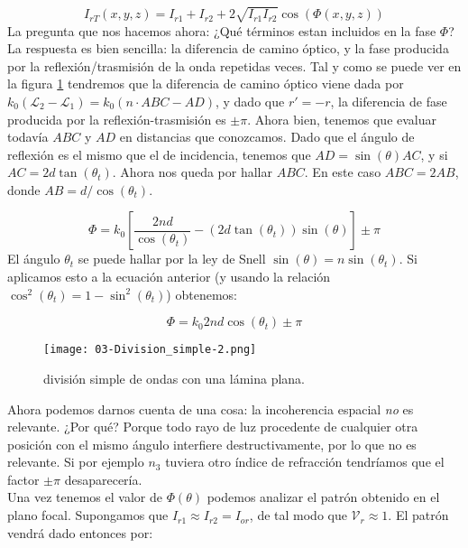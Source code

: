 \documentclass[12pt,a4paper]{book}
\numberwithin{equation}{section}
\numberwithin{figure}{section}
\newcommand{\ccorchetes}[1]{\left[ #1  \right]}
\newcommand{\1}{_{(1)}}
\newcommand{\2}{_{(2)}}
\theoremstyle{definition}
\begin{document}
\begin{equation}
I_{rT} (x,y,z) = I_{r1}+I_{r2} + 2 \sqrt{I_{r1} I_{r2}} \cos (\Phi(x,y,z))
\end{equation}
La pregunta que nos hacemos ahora: ¿Qué términos estan incluidos en la fase $\Phi$? La respuesta es bien sencilla: la diferencia de camino óptico, y la fase producida por la reflexión/trasmisión de la onda repetidas veces. Tal y como se puede ver en la figura \ref{Fig:03.1-02} tendremos que la diferencia de camino óptico viene dada por $k_0(\mathcal{L}_2 - \mathcal{L_1}) =k_0( n\cdot ABC-AD)$, y dado que $r'=-r$, la diferencia de fase producida por la reflexión-trasmisión es $\pm \pi$. Ahora bien, tenemos que evaluar todavía $ABC$ y $AD$ en distancias que conozcamos. Dado que el ángulo de reflexión es el mismo que el de incidencia, tenemos que $ {AD} = \sin(\theta) {AC}$, y si $AC=2  d \tan (\theta_t)$. Ahora nos queda por hallar $ABC$. En este caso $ABC=2AB$, donde $AB=d/\cos(\theta_t)$.

\begin{equation}
\Phi = k_0 \ccorchetes{\frac{2nd}{\cos (\theta_t)} - (2d\tan(\theta_t))\sin (\theta)}\pm \pi
\end{equation}
El ángulo $\theta_t$ se puede hallar por la ley de Snell $\sin (\theta) = n \sin (\theta_t)$. Si aplicamos esto a la ecuación anterior (y usando la relación $\cos^2 (\theta_t)= 1-\sin^2(\theta_t)$) obtenemos:

\begin{equation}
\Phi=k_0 2 n d \cos (\theta_t) \pm \pi
\end{equation}

\begin{figure}[h!] \centering
\texttt{[image: 03-Division\_simple-2.png]}
\caption{división simple de ondas con una lámina plana.}
\label{Fig:03.1-02}
\end{figure}

Ahora podemos darnos cuenta de una cosa: la incoherencia espacial \textit{no} es relevante. ¿Por qué? Porque todo rayo de luz procedente de cualquier otra posición con el mismo ángulo interfiere destructivamente, por lo que no es relevante. Si por ejemplo $n_3$ tuviera otro índice de refracción tendríamos que el factor $\pm \pi$ desaparecería. \\

Una vez tenemos el valor de $\Phi (\theta)$ podemos analizar el patrón obtenido en el plano focal. Supongamos que $I_{r1}\approx I_{r2} = I_{or}$, de tal modo que $\mathcal{V}_r \approx 1$. El patrón vendrá dado entonces por:
\end{document}
